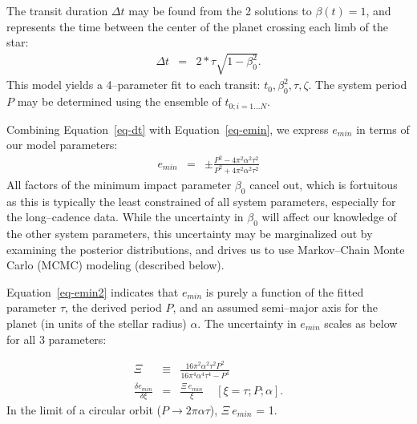The transit duration $\Delta t$ may be found from the 2 solutions to
$\beta(t) = 1$, and represents the time between the center of the
planet crossing each limb of the star:
\begin{eqnarray}
\Delta t & = & 2 * \tau \sqrt{1 - \beta_0^2}.
\label{eq-dt}
\end{eqnarray}
This model yields a 4--parameter fit to each transit: $t_0, \beta_0^2,
\tau, \zeta$.  The system period $P$ may be determined using the
ensemble of $t_{0;i=1...N}$.

Combining Equation~\ref{eq-dt} with Equation~\ref{eq-emin}, we express
$e_{min}$ in terms of our model parameters:
\begin{eqnarray}
e_{min} & = & \pm \frac{P^{2} - 4 \pi^{2} \alpha^{2} \tau^{2}}{P^{2} + 4 \pi^{2} \alpha^{2} \tau^{2}}
\label{eq-emin2}
\end{eqnarray}
All factors of the minimum impact parameter $\beta_0$ cancel out,
which is fortuitous as this is typically the least constrained of all
system parameters, especially for the long--cadence \kepler data.
While the uncertainty in $\beta_0$ will affect our knowledge of the
other system parameters, this uncertainty may be marginalized out by
examining the posterior distributions, and drives us to use
Markov--Chain Monte Carlo (MCMC) modeling (described below).

Equation~\ref{eq-emin2} indicates that $e_{min}$ is purely a function
of the fitted parameter $\tau$, the derived period $P$, and an assumed
semi--major axis for the planet (in units of the stellar radius)
$\alpha$.  The uncertainty in $e_{min}$ scales as below for all 3
parameters:

\begin{eqnarray}
\Xi & \equiv & \frac{16 \pi^{2} \alpha^{2} \tau^{2} P^{2}}{16 \pi^{4} \alpha^{4} \tau^{4} - P^{4}} \\
\frac{\delta e_{min}}{\delta \xi} & = & \frac{\Xi~e_{min}}{\xi} ~~~~~ \left[\xi = \tau; P; \alpha \right].\nonumber
\label{eq-emin3}
\end{eqnarray}
In the limit of a circular orbit ($P \rightarrow 2 \pi \alpha \tau$),
$\Xi~e_{min}$ = 1.


